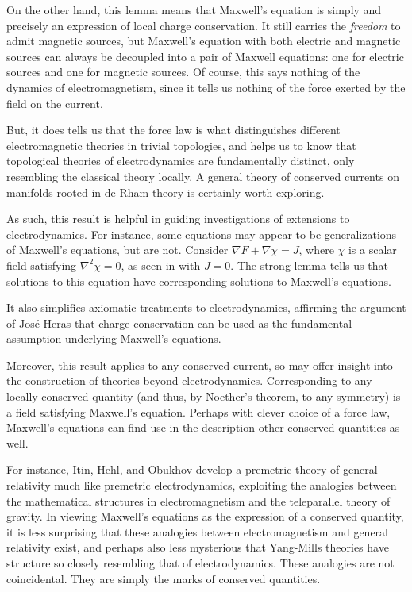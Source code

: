 \documentclass{article}
\begin{document}
On the other hand, this lemma means that Maxwell's equation is simply and precisely an expression of local charge conservation. It still carries the \emph{freedom} to admit magnetic sources, but Maxwell's equation with both electric and magnetic sources can always be decoupled into a pair of Maxwell equations: one for electric sources and one for magnetic sources. Of course, this says nothing of the dynamics of electromagnetism, since it tells us nothing of the force exerted by the field on the current.

But, it does tells us that the force law is what distinguishes different electromagnetic theories in trivial topologies, and helps us to know that topological theories of electrodynamics are fundamentally distinct, only resembling the classical theory locally. A general theory of conserved currents on manifolds rooted in de Rham theory is certainly worth exploring.

As such, this result is helpful in guiding investigations of extensions to electrodynamics. For instance, some equations may appear to be generalizations of Maxwell's equations, but are not. Consider $\nabla F + \nabla \chi = J$, where $\chi$ is a scalar field satisfying $\nabla^2 \chi = 0$, as seen in \cite{dvoe} with $J=0$. The strong lemma tells us that solutions to this equation have corresponding solutions to Maxwell's equations.

It also simplifies axiomatic treatments to electrodynamics, affirming the argument of Jos\'e Heras that charge conservation can be used as the fundamental assumption underlying Maxwell's equations.\cite{heras} 

Moreover, this result applies to any conserved current, so may offer insight into the construction of theories beyond electrodynamics. Corresponding to any locally conserved quantity (and thus, by Noether's theorem, to any symmetry) is a field satisfying Maxwell's equation. Perhaps with clever choice of a force law, Maxwell's equations can find use in the description other conserved quantities as well.

For instance, Itin, Hehl, and Obukhov develop a premetric theory of general relativity much like premetric electrodynamics, exploiting the analogies between the mathematical structures in electromagnetism and the teleparallel theory of gravity.\cite{itin} In viewing Maxwell's equations as the expression of a conserved quantity, it is less surprising that these analogies between electromagnetism and general relativity exist, and perhaps also less mysterious that Yang-Mills theories have structure so closely resembling that of electrodynamics. These analogies are not coincidental. They are simply the marks of conserved quantities.
\end{document}
